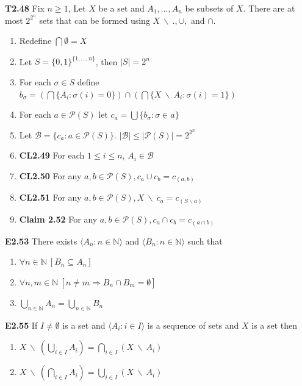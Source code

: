 \documentclass[10pt, landscape]{article}
\begin{document}
\begin{multicols*}{3}
\textbf{T2.48} Fix $n \geq 1$, Let $X$ be a set and $A_1, ..., A_n$ be subsets of $X$. There are at most $2^{2^n}$ sets that can be formed using $X \ \backslash \ ., \cup,$ and $\cap$.
\begin{enumerate}
    \item Redefine $\bigcap \emptyset = X$
    \item Let $S=\{0, 1\}^{\{1, ..., n\}}$, then $|S|=2^n$
    \item For each $\sigma \in S$ define $b_\sigma=(\bigcap\{A_i:\sigma(i)=0\})\cap(\bigcap\{X\ \backslash \ A_i:\sigma(i)=1\})$
    \item For each $a\in \mathcal{P}(S)$ let $c_a=\bigcup\{b_\sigma:\sigma\in a\}$
    \item Let $\mathcal{B}=\{c_a:a\in \mathcal{P}(S)\}$. $|\mathcal{B}|\leq|\mathcal{P}(S)|=2^{2^n}$
    \item \textbf{CL2.49} For each $1 \leq i \leq n$, $A_i\in \mathcal{B}$
    \item \textbf{CL2.50} For any $a, b \in \mathcal{P}(S),c_a \cup c_b = c_{(a,b)}$
    \item \textbf{CL2.51} For any $a, b \in \mathcal{P}(S), X \ \backslash \ c_a = c_{(S\backslash a)}$
    \item \textbf{Claim 2.52} For any $a,b\in \mathcal{P}(S), c_a \cap c_b = c_{(a\cap b)}$
\end{enumerate}

\textbf{E2.53} There exists $\langle A_n:n \in \mathbb{N} \rangle$ and $\langle B_n:n \in \mathbb{N} \rangle$ such that
\begin{enumerate}
    \item $\forall n \in \mathbb{N} \ [B_n \subseteq A_n]$
    \item $\forall n, m \in \mathbb{N} \ [n \neq m \Rightarrow B_n \cap B_m = \emptyset]$
    \item $\bigcup_{n \in \mathbb{N}}A_n=\bigcup_{n \in \mathbb{N}}B_n$
\end{enumerate}

\textbf{E2.55} If $I\neq \emptyset$ is a set and $\langle A_i : i \in I \rangle$ is a sequence of sets and $X$ is a set then 
\begin{enumerate}
    \item $X \ \backslash \ (\bigcup_{i \in I} A_i)=\bigcap_{i \in I} (X \ \backslash \ A_i)$
    \item $X \ \backslash \ (\bigcap_{i \in I} A_i)=\bigcup_{i \in I} (X \ \backslash \ A_i)$
\end{enumerate}


\end{multicols*}
\end{document}
